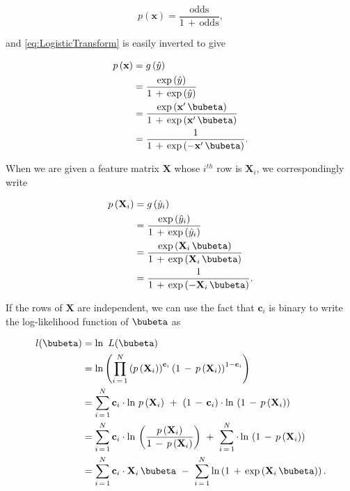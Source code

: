 \documentclass[graybox,envcountchap,sectrefs]{svmono}\usepackage[]{graphicx}\usepackage[]{xcolor}
\begin{document}
\begin{appendices}
\begin{equation}
p\left(\mathbf{x}\right)=\frac{\mathrm{odds}}{1\,+\,\mathrm{odds}},\label{eq:OddsVsP}
\end{equation}

and \eqref{eq:LogisticTransform} is easily inverted to give 

\begin{align}
p\left(\mathbf{x}\right) & =g\left(\hat{y}\right)\nonumber \\
 & =\frac{\exp\left(\hat{y}\right)}{1\,+\,\exp\left(\hat{y}\right)}\nonumber \\
 & =\frac{\exp\left(\mathbf{x}^{\prime}\,\bubeta\right)}{1\,+\,\exp\left(\mathbf{x}^{\prime}\,\bubeta\right)}\nonumber \\
 & =\frac{1}{1\,+\,\exp\left(-\mathbf{x}^{\prime}\,\bubeta\right)}.\label{eq:LogisticTransform2}
\end{align}

When we are given a feature matrix $\mathbf{X}$ whose $i^{th}$ row
is $\mathbf{X}_{i}$, we correspondingly write

\begin{align}
p\left(\mathbf{X}_{i}\right) & =g\left(\hat{y}_{i}\right)\nonumber \\
 & =\frac{\exp\left(\hat{y}_{i}\right)}{1\,+\,\exp\left(\hat{y}_{i}\right)}\nonumber \\
 & =\frac{\exp\left(\mathbf{X}_{i}\,\bubeta\right)}{1\,+\,\exp\left(\mathbf{X}_{i}\,\bubeta\right)}\nonumber \\
 & =\frac{1}{1\,+\,\exp\left(-\mathbf{X}_{i}\,\bubeta\right)}.\label{eq:LogisticTransform3}
\end{align}

If the rows of $\mathbf{X}$ are independent, we can use the fact
that $\mathbf{c}_{i}$ is binary to write the log-likelihood function
of $\bubeta$ as

\begin{align}
l(\bubeta) & =\ln\ L(\bubeta)\nonumber \\
 & =\ln\left(\prod_{i\,=\,1}^{N}\left(p\left(\mathbf{X}_{i}\right)\right)^{\mathbf{c}_{i}}\left(1\,-\,p\left(\mathbf{X}_{i}\right)\right)^{1-\mathbf{c}_{i}}\right)\nonumber \\
 & =\sum_{i\,=\,1}^{N}\mathbf{c}_{i}\cdot\ln\,p\left(\mathbf{X}_{i}\right)\ +\ \left(1\,-\,\mathbf{c}_{i}\right)\cdot\ln\,\left(1\,-\,p\left(\mathbf{X}_{i}\right)\right)\nonumber \\
 & =\sum_{i\,=\,1}^{N}\mathbf{c}_{i}\cdot\ln\,\left(\frac{p\left(\mathbf{X}_{i}\right)}{1\,-\,p\left(\mathbf{X}_{i}\right)}\right)\ +\ \sum_{i\,=\,1}^{N}\cdot\ln\,\left(1\,-\,p\left(\mathbf{X}_{i}\right)\right)\nonumber \\
 & =\sum_{i\,=\,1}^{N}\mathbf{c}_{i}\cdot\mathbf{X}_{i}\,\bubeta\ -\ \sum_{i\,=\,1}^{N}\ln\left(1\,+\,\exp\left(\mathbf{X}_{i}\,\bubeta\right)\right).\label{eq:LogLikelihoodLogisticRegression}
\end{align}


\end{appendices}
\end{document}
